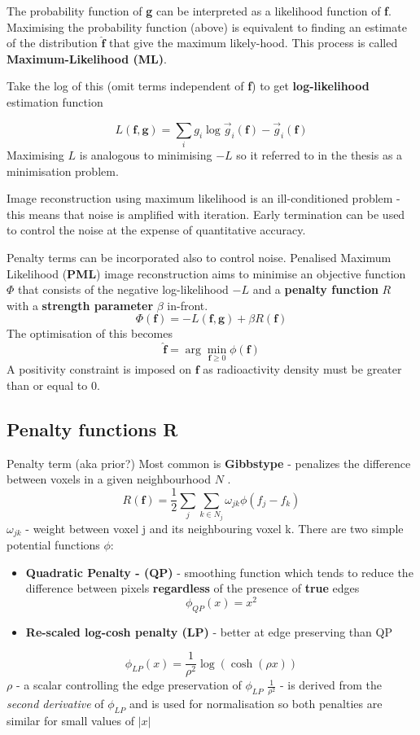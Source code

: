 \documentclass{article}
\begin{document}
The probability function of \textbf{g} can be interpreted as a likelihood function of \textbf{f}. Maximising the probability function (above) is equivalent to finding an estimate of the distribution $\hat{\textbf{f}}$ that give the maximum likely-hood. This process is called \textbf{Maximum-Likelihood (ML)}.

Take the log of this (omit terms independent of \textbf{f}) to get \textbf{log-likelihood} estimation function

\[
L(\textbf{f},\textbf{g}) = 
\sum_i g_i \log \vec{g}_i (\textbf{f}) - \vec{g}_i (\textbf{f})
\]
Maximising $L$ is analogous to minimising $-L$ so it referred to in the thesis as a minimisation problem. 

Image reconstruction using maximum likelihood is an ill-conditioned problem - this means that noise is amplified with iteration. 
Early termination can be used to control the noise at the expense of quantitative accuracy.

Penalty terms can be incorporated also to control noise. Penalised Maximum Likelihood (\textbf{PML}) image reconstruction aims to minimise an objective function $\Phi$ that consists of the negative log-likelihood $-L$ and a \textbf{penalty function} $R$ with a \textbf{strength parameter} $\beta$ in-front.
\[
\Phi(\textbf{f}) = -L(\textbf{f},\textbf{g})  + \beta R(\textbf{f})
\]
The optimisation of this becomes
\[
\hat{\textbf{f}} = 
\arg \min_{\textbf{f}\geq 0} \phi (\textbf{f})  
\]
A positivity constraint is imposed on $\textbf{f}$ as radioactivity density must be greater than or equal to 0. 

\subsection{Penalty functions R}
Penalty term (aka prior?)
Most common is \textbf{Gibbstype} - penalizes the difference between voxels in a given neighbourhood $N$ .
\[
R(\textbf{f}) =
\frac{1}{2} \sum_j \sum_{k\in N_j} \omega_{jk} \phi(f_j - f_k) 
\]
$\omega_{jk}$ - weight between voxel j and its neighbouring voxel k. 
There are two simple potential functions $\phi$:
\begin{itemize}
\item \textbf{Quadratic Penalty - (QP) }- smoothing function which tends to reduce the difference between pixels \textbf{regardless} of the presence of \textbf{true} edges
\[
\phi_{QP}(x) = x^2
\]
\end{itemize}
\begin{itemize}
\item \textbf{Re-scaled log-cosh penalty (LP)} - better at edge preserving than QP
\end{itemize}
\[
\phi_{LP}(x) = 
\frac{1}{\rho^2} \log(\cosh(\rho x)) 
\]
$\rho$ - a scalar controlling the edge preservation of $\phi_{LP}$ 
$\frac{1}{\rho^2}$ - is derived from the \textit{second derivative} of $\phi_{LP}$ and is used for normalisation so both penalties are similar for small values of $|x|$ 
\end{document}

